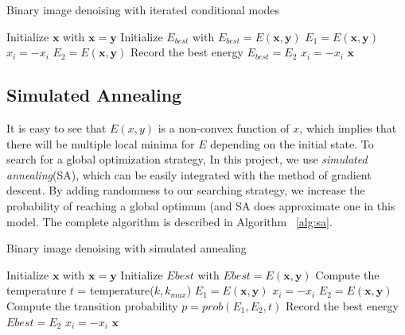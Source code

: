 \documentclass[conference]{IEEEtran}
\begin{document}
\begin{algorithm}
\centering
\caption{Binary image denoising with iterated conditional modes}
\label{alg:icm}
  \begin{algorithmic}[1]
        \State Initialize $\mathbf{x}$ with $\mathbf{x} = \mathbf{y}$
        \State Initialize $E_{best}$ with $E_{best} = E(\mathbf{x}, \mathbf{y})$
	    		\State $E_1 = E(\mathbf{x}, \mathbf{y})$
	    		\State $x_{i} = - x_{i}$ 
	    		\State $E_2 = E(\mathbf{x}, \mathbf{y})$
		    			\State Record the best energy $E_{best} = E_2$
		    		\EndIf
		    	\Else
		    		\State $x_{i} = - x_{i}$ 
		    	\EndIf
	    	\EndFor
	    \EndFor
      \Return $\mathbf{x}$
    \EndFunction
  \end{algorithmic}
\end{algorithm}

\subsection{Simulated Annealing}
It is easy to see that $E(x,y)$ is a non-convex function of $x$, which implies that there will be multiple local minima for $E$ depending on the initial state. To search for a global optimization strategy, In this project, we use \textit{simulated annealing}(SA), which can be easily integrated with the method of gradient descent. By adding randomness to our searching strategy, we increase the probability of reaching a global optimum (and SA does approximate one in this model. The complete algorithm is described in Algorithm ~\ref{alg:sa}.

\begin{algorithm}
\centering
\caption{Binary image denoising with simulated annealing}
\label{alg:sa}
  \begin{algorithmic}[1]
        \State Initialize $\mathbf{x}$ with $\mathbf{x} = \mathbf{y}$
        \State Initialize $Ebest$ with $Ebest = E(\mathbf{x}, \mathbf{y})$
	    	\State Compute the temperature $t$ = temperature($k,k_{max}$)
	    		\State $E_1 = E(\mathbf{x}, \mathbf{y})$
	    		\State $x_{i} = - x_{i}$ 
	    		\State $E_2 = E(\mathbf{x}, \mathbf{y})$
	    		\State Compute the transition probability $p = prob(E_1, E_2, t)$
		    			\State Record the best energy $Ebest = E_2$
		    		\EndIf
		    	\Else
		    		\State $x_{i} = - x_{i}$ 
		    	\EndIf
	    	\EndFor
	    \EndFor
      \Return $\mathbf{x}$
    \EndFunction
  \end{algorithmic}
\end{algorithm}
\end{document}

